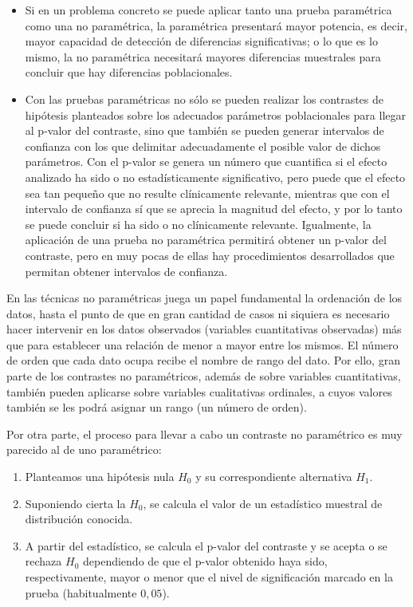 \begin{itemize}
\item Si en un problema concreto se puede aplicar tanto una prueba paramétrica como una no paramétrica, la paramétrica presentará mayor
potencia, es decir, mayor capacidad de detección de diferencias significativas; o lo que es lo mismo, la no paramétrica necesitará mayores
diferencias muestrales para concluir que hay diferencias poblacionales.

\item Con las pruebas paramétricas no sólo se pueden realizar los contrastes de hipótesis planteados sobre los adecuados parámetros
poblacionales para llegar al p-valor del contraste, sino que también se pueden generar intervalos de confianza con los que delimitar
adecuadamente el posible valor de dichos parámetros. Con el p-valor se genera un número que cuantifica si el efecto analizado ha sido o no
estadísticamente significativo, pero puede que el efecto sea tan pequeño que no resulte clínicamente relevante, mientras que con el
intervalo de confianza sí que se aprecia la magnitud del efecto, y por lo tanto se puede concluir si ha sido o no clínicamente relevante.
Igualmente, la aplicación de una prueba no paramétrica permitirá obtener un p-valor del contraste, pero en muy pocas de ellas hay
procedimientos desarrollados que permitan obtener intervalos de confianza.
\end{itemize}

En las técnicas no paramétricas juega un papel fundamental la ordenación de los datos, hasta el punto de que en gran cantidad de casos ni
siquiera es necesario hacer intervenir en los datos observados (variables cuantitativas observadas) más que para establecer una relación de
menor a mayor entre los mismos. El número de orden que cada dato ocupa recibe el nombre de rango del dato. Por ello, gran parte de los
contrastes no paramétricos, además de sobre variables cuantitativas, también pueden aplicarse sobre variables cualitativas ordinales, a
cuyos valores también se les podrá asignar un rango (un número de orden).

Por otra parte, el proceso para llevar a cabo un contraste no paramétrico es muy parecido al de uno paramétrico:
\begin{enumerate}
\item Planteamos una hipótesis nula $H_0$ y su correspondiente alternativa $H_1$.

\item Suponiendo cierta la $H_0$, se calcula el valor de un estadístico muestral de distribución conocida.

\item A partir del estadístico, se calcula el p-valor del contraste y se acepta o se rechaza $H_0$ dependiendo de que el p-valor obtenido
haya sido, respectivamente, mayor o menor que el nivel de significación marcado en la prueba (habitualmente $0,05$).
\end{enumerate}

